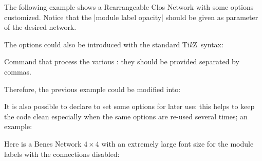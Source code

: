 \documentclass{ltxdoc}
\newcommand\Tikz{Ti\textit kZ}
\begin{document}
The following example shows a Rearrangeable Clos Network with some options customized. Notice that the |module label opacity| should be given as parameter of the desired network.

\begin{codeexample}[]
\begin{tikzpicture}[N=9,r1=3,M=9,r3=3]
    \node[module size=0.5cm,pin length factor=0.5,
        module ysep=1, module xsep=1.25,
        clos rear={module label opacity=0}] {};
\end{tikzpicture}
\end{codeexample}

The options could also be introduced with the standard \Tikz\ syntax:
\begin{command}{{\tikzset}}
    Command that process the various : they should be provided separated by commas.
\end{command}

Therefore, the previous example could be modified into:
\begin{codeexample}[]
\tikzset{module size=0.5cm,pin length factor=0.5,
         module ysep=1, module xsep=1.25,}
\begin{tikzpicture}[N=9,r1=3,M=9,r3=3]
    \node[clos rear={module label opacity=0}] {};
\end{tikzpicture}
\end{codeexample}

It is also possible to declare  to set some options for later use: this helps to keep the code clean especially when the same options are re-used several times; an example:
\begin{codeexample}
\tikzset{module size definition, 
 P=16,
}
\begin{tikzpicture}
    \node[benes] {};
\end{tikzpicture}
\end{codeexample}

Here is a Benes Network $4 \times 4$ with an extremely large font size for the module labels with the connections disabled:
\begin{codeexample}[]
\tikzset{my style, P=4, 
 module font=\huge\slshape, 
 connections disabled=true
}
\end{codeexample}
\end{document}
